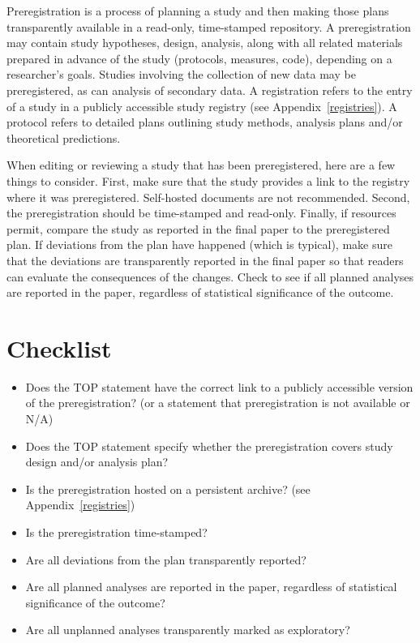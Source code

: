 \documentclass[
  oneside]{book}
\providecommand{\tightlist}{%
  \setlength{\itemsep}{0pt}\setlength{\parskip}{0pt}}
\begin{document}
Preregistration is a process of planning a study and then making those plans transparently available in a read-only, time-stamped repository. A preregistration may contain study hypotheses, design, analysis, along with all related materials prepared in advance of the study (protocols, measures, code), depending on a researcher's goals. Studies involving the collection of new data may be preregistered, as can analysis of secondary data. A registration refers to the entry of a study in a publicly accessible study registry (see Appendix~\ref{registries}). A protocol refers to detailed plans outlining study methods, analysis plans and/or theoretical predictions.

When editing or reviewing a study that has been preregistered, here are a few things to consider. First, make sure that the study provides a link to the registry where it was preregistered. Self-hosted documents are not recommended. Second, the preregistration should be time-stamped and read-only. Finally, if resources permit, compare the study as reported in the final paper to the preregistered plan. If deviations from the plan have happened (which is typical), make sure that the deviations are transparently reported in the final paper so that readers can evaluate the consequences of the changes. Check to see if all planned analyses are reported in the paper, regardless of statistical significance of the outcome.

\hypertarget{checklist}{%
\section{Checklist}\label{checklist}}

\begin{itemize}
\tightlist
\item
  Does the TOP statement have the correct link to a publicly accessible version of the preregistration? (or a statement that preregistration is not available or N/A)
\item
  Does the TOP statement specify whether the preregistration covers study design and/or analysis plan?
\item
  Is the preregistration hosted on a persistent archive? (see Appendix~\ref{registries})
\item
  Is the preregistration time-stamped?
\item
  Are all deviations from the plan transparently reported?
\item
  Are all planned analyses are reported in the paper, regardless of statistical significance of the outcome?
\item
  Are all unplanned analyses transparently marked as exploratory?
\end{itemize}
\end{document}
